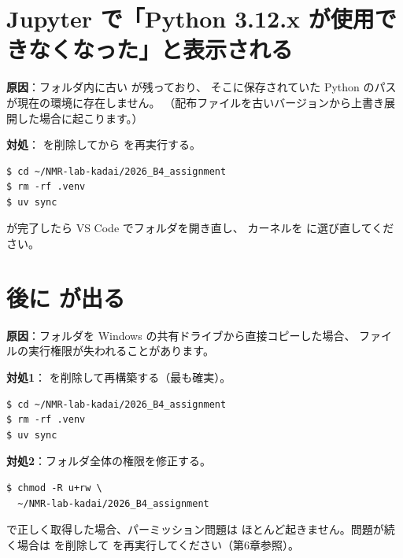 \section{Jupyter で「Python 3.12.x が使用できなくなった」と表示される}

\textbf{原因}：フォルダ内に古い  が残っており、
そこに保存されていた Python のパスが現在の環境に存在しません。
（配布ファイルを古いバージョンから上書き展開した場合に起こります。）

\textbf{対処}： を削除してから  を再実行する。

\begin{wslbox}
\begin{lstlisting}[style=bash]
$ cd ~/NMR-lab-kadai/2026_B4_assignment
$ rm -rf .venv
$ uv sync
\end{lstlisting}
\end{wslbox}

 が完了したら VS Code でフォルダを開き直し、
カーネルを  に選び直してください。

\section{ 後に  が出る}

\textbf{原因}：フォルダを Windows の共有ドライブから直接コピーした場合、
ファイルの実行権限が失われることがあります。

\textbf{対処1}： を削除して再構築する（最も確実）。

\begin{wslbox}
\begin{lstlisting}[style=bash]
$ cd ~/NMR-lab-kadai/2026_B4_assignment
$ rm -rf .venv
$ uv sync
\end{lstlisting}
\end{wslbox}

\textbf{対処2}：フォルダ全体の権限を修正する。

\begin{wslbox}[権限の変更]
\begin{lstlisting}[style=bash]
$ chmod -R u+rw \
  ~/NMR-lab-kadai/2026_B4_assignment
\end{lstlisting}
\end{wslbox}

\begin{notebox}
 で正しく取得した場合、パーミッション問題は
ほとんど起きません。問題が続く場合は  を削除して
 を再実行してください（第6章参照）。
\end{notebox}

